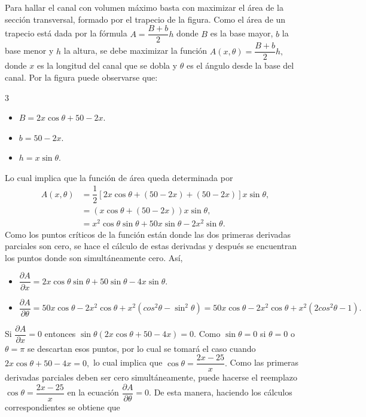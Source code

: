 \begin{prob}
\begin{myproof}
Para hallar el canal con volumen máximo basta con maximizar el área de la sección transversal, formado por el trapecio de la figura. Como el área de un trapecio está dada por la fórmula $A=\dfrac{B+b}{2}h$ donde $B$ es la base mayor, $b$ la base menor y $h$ la altura, se debe maximizar la función $A(x,\theta)=\dfrac{B+b}{2}h,$ donde $x$ es la longitud del canal que se dobla y $\theta$ es el ángulo desde la base del canal.
Por la figura puede observarse que:
\begin{multicols}{3}
\begin{itemize}
\item $B=2x\cos \theta + 50-2x.$
\item $b=50-2x.$
\item $h=x\sin \theta.$
\end{itemize}
\end{multicols}
Lo cual implica que la función de área queda determinada por
\begin{align*}
A(x,\theta)&=\dfrac{1}{2}\left[ 2x\cos \theta+(50-2x)+(50-2x) \right]x\sin \theta,\\
&=\left(x\cos \theta+(50-2x)\right)x\sin \theta,\\
&=x^2\cos\theta \sin \theta+50x\sin \theta-2x^2\sin \theta.
\end{align*}
Como los puntos críticos de la función están donde las dos primeras derivadas parciales son cero, se hace el cálculo de estas derivadas y  después se encuentran los puntos donde son simultáneamente cero. Así,
\begin{itemize}
\item $\dfrac{\partial A}{\partial x}=2x\cos\theta\sin\theta +50\sin \theta -4x\sin \theta.$
\item $\dfrac{\partial A}{\partial \theta}=50 x \cos \theta -2 x^2\cos \theta +x^2\left(cos^{2}\theta-\sin^{2}\theta\right)=50 x \cos \theta -2 x^2\cos \theta +x^2\left(2cos^{2}\theta-1\right).$  
\end{itemize}
Si $\dfrac{\partial A}{\partial x}=0$ entonces $\sin \theta \left( 2x\cos\theta +50-4x \right)=0.$ Como $\sin \theta=0$ si $\theta =0$ o $\theta =\pi$ se descartan esos puntos, por lo cual se tomará el caso cuando $2x\cos\theta +50-4x =0,$ lo cual implica que $\cos \theta=\dfrac{2x-25}{x}.$
Como las primeras derivadas parciales deben ser cero simultáneamente, puede hacerse el reemplazo $\cos \theta=\dfrac{2x-25}{x}$ en la ecuación $\dfrac{\partial A}{\partial \theta}=0.$ 
De esta manera, haciendo los cálculos correspondientes se obtiene que
\begin{align*}

\end{align*}
\end{myproof}
\end{prob}
